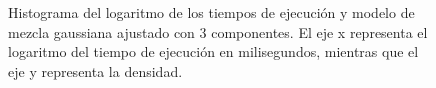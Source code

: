 \begin{figure}[h]
    \begin{center}
    \end{center}
    \caption{\label{figure:gaussmix}Histograma del logaritmo de los tiempos de ejecución y modelo de mezcla gaussiana ajustado con 3 componentes. El eje x representa el logaritmo del tiempo de ejecución en milisegundos, mientras que el eje y representa la densidad.}
\end{figure}